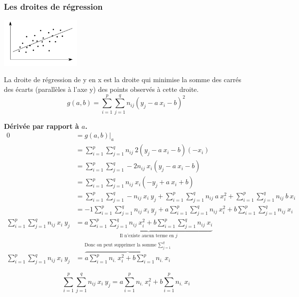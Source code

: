 \subsubsection{Les droites de régression}

\begin{center}
	\includegraphics[width=0.3\textwidth]{images/droite_de_regression.pdf}
\end{center}
La droite de régression de y en x est la droite qui minimise la somme des carrés des écarts (parallèles à l'axe y) des points observés à cette droite.
$$\boxed{g(a,b) = \sum_{i=1}^{p} \sum_{j=1}^{q} n_{ij} (y_j - a\ x_i - b)^2}$$


\textbf{Dérivée par rapport à $a$.}
\begin{align*}
0 &= \left.g(a,b)\right|_a\\
  &= \sum_{i=1}^{p} \sum_{j=1}^{q} n_{ij}\ 2(y_j - a\ x_i-b)(-x_i)\\
  &= \sum_{i=1}^{p} \sum_{j=1}^{q} -2n_{ij}\ x_i(y_j - a\ x_i - b)\\
  &= \sum_{i=1}^{p} \sum_{j=1}^{q} n_{ij}\ x_i(-y_j + a\ x_i + b)\\
  &= \sum_{i=1}^{p} \sum_{j=1}^{q} -n_{ij}\ x_i\ y_j + \sum_{i=1}^{p} \sum_{j=1}^{q} n_{ij}\ a\ x_i^2 + \sum_{i=1}^{p} \sum_{j=1}^{q} n_{ij}\ b\ x_i\\
  &= -1 \sum_{i=1}^{p} \sum_{j=1}^{q} n_{ij}\ x_i\ y_j + a \sum_{i=1}^{p} \sum_{j=1}^{q} n_{ij}\ x_i^2 + b \sum_{i=1}^{p} \sum_{j=1}^{q} n_{ij}\ x_i\\
  \sum_{i=1}^{p} \sum_{j=1}^{q} n_{ij}\ x_i\ y_j  &= \underbrace{a \sum_{i=1}^{p} \sum_{j=1}^{q} n_{ij}\ x_i^2 + b \sum_{i=1}^{p} \sum_{j=1}^{q} n_{ij}\ x_i}_\text{Il n'existe aucun terme en $j$}\\
\sum_{i=1}^{p} \sum_{j=1}^{q} n_{ij}\ x_i\ y_j  &= \overbrace{a \sum_{i=1}^{p} n_{i.}\ x_i^2 + b \sum_{i=1}^{p} n_{i.}\ x_i}^\text{Donc on peut supprimer la somme $\sum_{j=1}^{q}$}
\end{align*}


$$\boxed{\sum_{i=1}^{p} \sum_{j=1}^{q} n_{ij}\ x_i\ y_j = a \sum_{i=1}^{p} n_{i.}\ x_i^2 + b \sum_{i=1}^{p} n_{i.}\ x_i}$$


